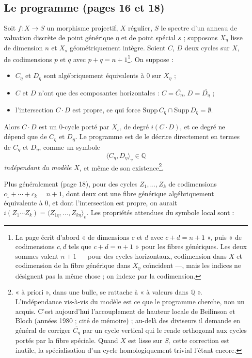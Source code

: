 \documentclass[11pt,a4paper]{article}
\begin{document}
\subsection*{Le programme (pages 16 et 18)}

Soit $f : X \to S$ un morphisme projectif, $X$ régulier, $S$ le spectre
d'un anneau de valuation discrète de point générique $\eta$ et de point
spécial $s$ ; supposons $X_\eta$ lisse de dimension $n$ et $X_s$
géométriquement intègre. Soient $C$, $D$ deux cycles sur $X$, de
codimensions $p$ et $q$ avec $p + q = n + 1$\footnote{La page écrit d'abord
« de dimensions $c$ et $d$ avec $c + d = n + 1$ », puis « de codimensions
$c, d$ tels que $c + d = n + 1$ » pour les fibres génériques. Les deux
sommes valent $n + 1$ — pour des cycles horizontaux, codimension dans $X$
et codimension de la fibre générique dans $X_\eta$ coïncident —, mais les
indices ne désignent pas la même chose ; on indexe par la codimension.}.
On suppose :

\begin{itemize}
  \item[a)] $C_\eta$ et $D_\eta$ sont algébriquement équivalents à $0$ sur
  $X_\eta$ ;
  \item[b)] $C$ et $D$ n'ont que des composantes horizontales :
  $C = \overline{C_\eta}$, $D = \overline{D_\eta}$ ;
  \item[c)] l'intersection $C \cdot D$ est propre, ce qui force
  $\mathrm{Supp}\,C_\eta \cap \mathrm{Supp}\,D_\eta = \emptyset$.
\end{itemize}

Alors $C \cdot D$ est un $0$-cycle porté par $X_s$, de degré $i(C \cdot D)$,
et ce degré ne dépend que de $C_\eta$ et $D_\eta$. Le programme est de le
décrire directement en termes de $C_\eta$ et $D_\eta$, comme un symbole
\[
  \langle C_\eta, D_\eta\rangle_v \in \mathbb{Q}
\]
\emph{indépendant du modèle $X$}, et même de son existence\footnote{« à
priori », dans une bulle, se rattache à « à valeurs dans $\mathbb{Q}$ ».
L'indépendance vis-à-vis du modèle est ce que le programme cherche, non
un acquis. C'est aujourd'hui l'accouplement de hauteur locale de
Beilinson et Bloch (années 1980 ; cité de mémoire) ; au-delà des diviseurs
il demande en général de corriger $\overline{C_\eta}$ par un cycle vertical
qui le rende orthogonal aux cycles portés par la fibre spéciale. Quand
$X$ est lisse sur $S$, cette correction est inutile, la spécialisation d'un
cycle homologiquement trivial l'étant encore.}.

Plus généralement (page 18), pour des cycles $Z_1, \ldots, Z_k$ de
codimensions $c_1 + \cdots + c_k = n + 1$, dont deux ont une fibre générique
algébriquement équivalente à $0$, et dont l'intersection est propre, on
aurait $i(Z_1 \cdots Z_k) = \langle Z_{1\eta}, \ldots, Z_{k\eta}\rangle_v$.
Les propriétés attendues du symbole local sont :
\end{document}
